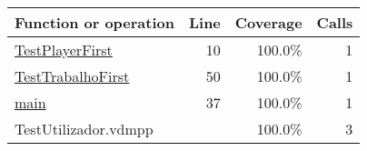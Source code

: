 \bigskip
\begin{longtable}{|l|r|r|r|}
\hline
Function or operation & Line & Coverage & Calls \\
\hline
\hline
\hyperref[TestPlayerFirst:10]{TestPlayerFirst} & 10&100.0\% & 1 \\
\hline
\hyperref[TestTrabalhoFirst:50]{TestTrabalhoFirst} & 50&100.0\% & 1 \\
\hline
\hyperref[main:37]{main} & 37&100.0\% & 1 \\
\hline
\hline
TestUtilizador.vdmpp & & 100.0\% & 3 \\
\hline
\end{longtable}

